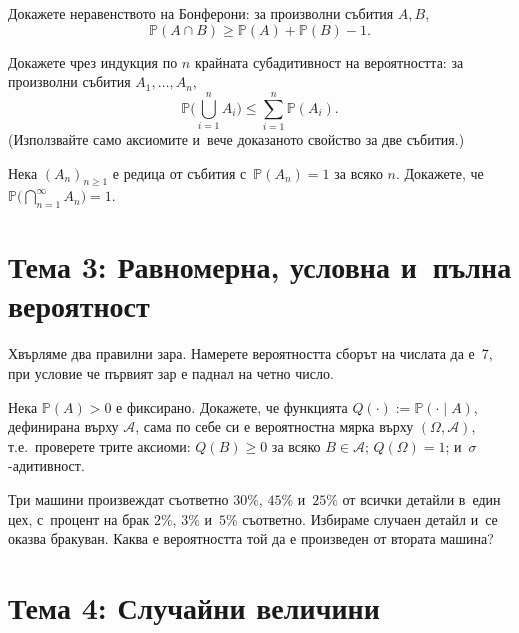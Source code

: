 \begin{probbox}[Задача 2.1]
Докажете неравенството на Бонферони: за произволни събития $A,B$,
\[
  \mathbb P(A\cap B) \ge \mathbb P(A)+\mathbb P(B)-1.
\]
\end{probbox}

\begin{probbox}[Задача 2.2]
Докажете чрез индукция по $n$ крайната субадитивност на вероятността:
за произволни събития $A_1,\dots,A_n$,
\[
  \mathbb P\Big(\bigcup_{i=1}^n A_i\Big) \le \sum_{i=1}^n \mathbb P(A_i).
\]
(Използвайте само аксиомите и~вече доказаното свойство за две
събития.)
\end{probbox}

\begin{probbox}[Задача 2.3]
Нека $(A_n)_{n\ge1}$ е редица от събития с~$\mathbb P(A_n)=1$ за
всяко $n$. Докажете, че $\mathbb P\big(\bigcap_{n=1}^{\infty}
A_n\big)=1$.
\end{probbox}

\section*{Тема 3: Равномерна, условна и~пълна вероятност}

\begin{probbox}[Задача 3.1]
Хвърляме два правилни зара. Намерете вероятността сборът на числата
да е~7, при условие че първият зар е паднал на четно число.
\end{probbox}

\begin{probbox}[Задача 3.2]
Нека $\mathbb P(A)>0$ е фиксирано. Докажете, че функцията
$Q(\cdot):=\mathbb P(\cdot\mid A)$, дефинирана върху $\mathcal A$,
сама по себе си е вероятностна мярка върху $(\Omega,\mathcal A)$,
т.е.\ проверете трите аксиоми: $Q(B)\ge0$ за всяко $B\in\mathcal A$;
$Q(\Omega)=1$; и~$\sigma$-адитивност.
\end{probbox}

\begin{probbox}[Задача 3.3]
Три машини произвеждат съответно $30\%$, $45\%$ и~$25\%$ от всички
детайли в~един цех, с~процент на брак $2\%$, $3\%$ и~$5\%$
съответно. Избираме случаен детайл и~се оказва бракуван. Каква е
вероятността той да е произведен от втората машина?
\end{probbox}

\section*{Тема 4: Случайни величини}

